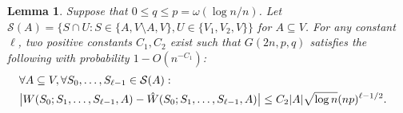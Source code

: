 \documentclass[letterpaper,11pt]{article}
\newtheorem{lemma}[theorem]{Lemma}
\newcommand{\W}{W}
\newcommand{\Wh}{\hat{W}}
\begin{document}
\begin{lemma}
\label{lem:WIdiscrepancy2}
Suppose that $0\leq q\leq p=\omega(\log n/n)$.
Let $\mathcal{S}(A)=\bigl\{ S\cap U: S\in \{A,V\setminus A, V\}, U\in \{V_1, V_2, V\} \bigr\}$ for $A\subseteq V$.
For any constant $\ell$, two positive constants $C_1, C_2$ exist such that $G(2n,p,q)$ satisfies the following with probability $1-O(n^{-C_1})$:
\begin{align*}
\lefteqn{\forall A\subseteq V, \forall S_0, \ldots, S_{\ell-1}\in \mathcal{S}(A):}\\
&\bigl|\W(S_0;S_1,\ldots,S_{\ell-1}, A)-\Wh(S_0;S_1,\ldots,S_{\ell-1}, A)\bigr|\leq  C_2 |A|\sqrt{\log n}(np)^{\ell-1/2}.
\end{align*}
\end{lemma}
\end{document}
